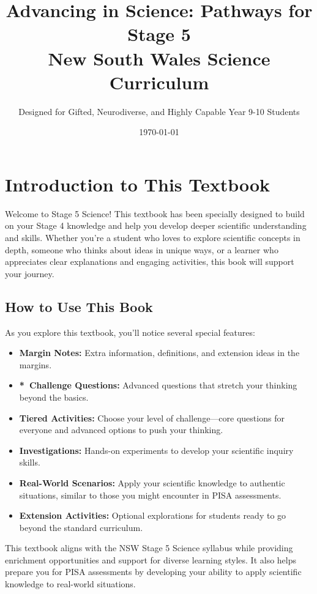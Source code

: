 \documentclass[justified,notoc]{tufte-book}
\title{Advancing in Science: Pathways for Stage 5\\
New South Wales Science Curriculum}
\author{Designed for Gifted, Neurodiverse, and Highly Capable Year 9-10 Students}
\date{\today}
\newcommand{\challengeicon}{*}
\begin{document}
\maketitle

\tableofcontents

\chapter*{Introduction to This Textbook}

Welcome to Stage 5 Science! This textbook has been specially designed to build on your Stage 4 knowledge and help you develop deeper scientific understanding and skills. Whether you're a student who loves to explore scientific concepts in depth, someone who thinks about ideas in unique ways, or a learner who appreciates clear explanations and engaging activities, this book will support your journey.

\section*{How to Use This Book}

As you explore this textbook, you'll notice several special features:

\begin{itemize}
    \item \textbf{Margin Notes:} Extra information, definitions, and extension ideas in the margins.
    \item \textbf{\challengeicon\ Challenge Questions:} Advanced questions that stretch your thinking beyond the basics.
    \item \textbf{Tiered Activities:} Choose your level of challenge—core questions for everyone and advanced options to push your thinking.
    \item \textbf{Investigations:} Hands-on experiments to develop your scientific inquiry skills.
    \item \textbf{Real-World Scenarios:} Apply your scientific knowledge to authentic situations, similar to those you might encounter in PISA assessments.
    \item \textbf{Extension Activities:} Optional explorations for students ready to go beyond the standard curriculum.
\end{itemize}

This textbook aligns with the NSW Stage 5 Science syllabus while providing enrichment opportunities and support for diverse learning styles. It also helps prepare you for PISA assessments by developing your ability to apply scientific knowledge to real-world situations.
\end{document}
